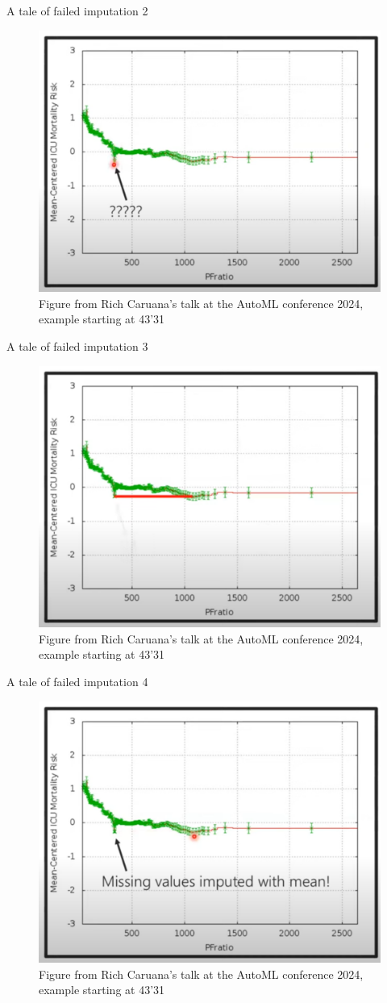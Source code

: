 \documentclass[11pt,compress,t,notes=noshow, aspectratio=169, xcolor=table]{beamer}
\begin{document}
\begin{frame}{A tale of failed imputation 2}
\vfill
\begin{figure}
    \centering
    \includegraphics[width=0.5\linewidth]{slides/07_imputation/figure_man/Screenshot from 2025-06-03 22-38-27.png}
    \caption{Figure from Rich Caruana's talk at the AutoML conference 2024, example starting at 43'31 \href{https://www.youtube.com/watch?v=5mH7Fyy5wQY}{}}
\end{figure}
\vfill    
\end{frame}

\begin{frame}{A tale of failed imputation 3}
\vfill
\begin{figure}
    \centering
    \includegraphics[width=0.5\linewidth]{slides/07_imputation/figure_man/Screenshot from 2025-06-03 22-38-34.png}
    \caption{Figure from Rich Caruana's talk at the AutoML conference 2024, example starting at 43'31 \href{https://www.youtube.com/watch?v=5mH7Fyy5wQY}{}}
\end{figure}
\vfill
\end{frame}

\begin{frame}{A tale of failed imputation 4}
\vfill
\begin{figure}
    \centering
    \includegraphics[width=0.5\linewidth]{slides/07_imputation/figure_man/Screenshot from 2025-06-03 22-38-41.png}
    \caption{Figure from Rich Caruana's talk at the AutoML conference 2024, example starting at 43'31 \href{https://www.youtube.com/watch?v=5mH7Fyy5wQY}{}}
\end{figure}
\vfill
\end{frame}
\end{document}
